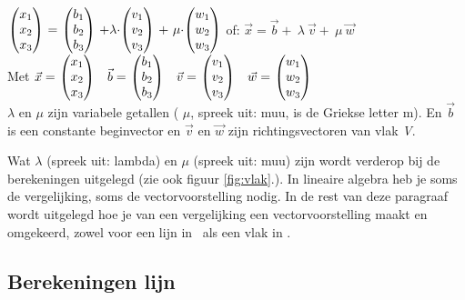 \\  \\

{  $ \vecdriesnel{x} \ =\ \vecdriesnel{b}  \ +  \lambda\cdot \vecdriesnel{v} \   + \  \mu\cdot \vecdriesnel{w} $ \qquad \qquad  of:  $ \vec{x}  =   \vec{b}  + \  \lambda \ \vec{v} + \  \mu \ \vec{w}  $ }\\ 
Met $ \vec{x}  = \   \vecdriesnel{x}  \quad    \vec{b} = \  \vecdriesnel{b} \quad    \vec{v} =  \  \vecdriesnel{v} \quad   \vec{w} =  \ \vecdriesnel{w} $  \\   $ \lambda $ en  $ \mu $ zijn variabele getallen ( $ \mu $, spreek uit: muu, is de Griekse letter m). En  $ \vec{b} $ is een constante beginvector en $ \vec{v}  $  en $ \vec{w}  $ zijn richtingsvectoren van vlak \textit{V}.\\ 


Wat  $ \lambda $ (spreek uit: lambda) en  $ \mu $ (spreek uit: muu) zijn wordt verderop bij de berekeningen uitgelegd (zie ook figuur  \ref{fig:vlak}.).  In lineaire algebra heb je soms de vergelijking, soms de vectorvoorstelling nodig. In de rest van deze paragraaf wordt uitgelegd hoe je van een vergelijking een vectorvoorstelling maakt en omgekeerd, zowel voor een lijn in \RT \ als een vlak in \RD. 


\subsection{Berekeningen lijn}

